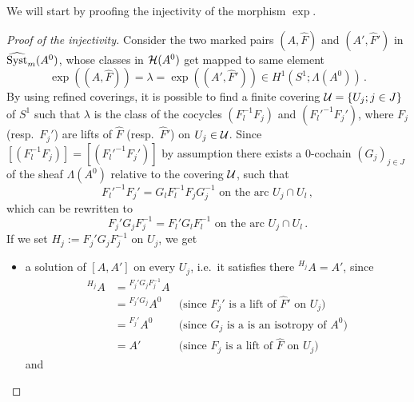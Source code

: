 We will start by proofing the injectivity of the morphism $\exp$.
\begin{proof}[Proof of the injectivity]
  Consider the two marked pairs $(A,\hat F)$ and $(A',\hat F')$ in
  $\widehat{\operatorname{Syst}}_m(A^0)$, whose classes in $\mathcal{H}(A^0)$ get mapped to same element
  \[
    \exp((A,\hat F))=\lambda=\exp((A',\hat F'))
      \in H^1(S^1;\Lambda(A^0)) \,.
  \]
  By using refined coverings, it is possible to find a finite covering
  $\mathcal{U}=\{U_j;j\in J\}$ of $S^1$ such that $\lambda$ is the class of the
  cocycles $(F_l^{-1}F_j)$ and $(F_l'^{-1}F_j')$, where $F_j$ (resp.\ $F_j'$)
  are lifts of $\hat F$ (resp.\ $\hat F'$) on $U_j\in\mathcal{U}$.
  Since $[(F_l^{-1}F_j)]=[(F_l'^{-1}F_j')]$ by assumption there exists a
  $0$-cochain $(G_j)_{j\in J}$ of the sheaf $\Lambda(A^0)$ relative to the
  covering $\mathcal{U}$, such that
  \[
    F_l'^{-1}F_j'=G_lF_l^{-1}F_jG_j^{-1}
    \text{~on~the~arc~} U_j\cap U_l \,,
  \]
  which can be rewritten to
  \[
    F_j'G_jF_j^{-1} = F_l'G_lF_l^{-1}
    \text{~on~the~arc~} U_j\cap U_l \,.
  \]
  If we set $H_j:=F_j'G_{j}F_j^{-1}$ on $U_{j}$, we get
  \begin{itemize}
    \item a solution of $[A,A']$ on every $U_j$, i.e.\ it
      satisfies there ${}^{H_j}A=A'$, since
      \begin{align*}
        {}^{H_j}A &= {}^{F_j'G_{j}F_j^{-1}}A
        \\&={}^{F_j'G_{j}}A^0
        & \text{(since $F_j'$ is a lift of $\hat F'$ on $U_j$)}
        \\&={}^{F_j'}A^0
        & \text{(since $G_j$ is a is an isotropy of $A^0$)}
        \\&=A'
        & \text{(since $F_j$ is a lift of $\hat F$ on $U_j$)}
      \end{align*}
      and

\end{itemize}
\end{proof}
